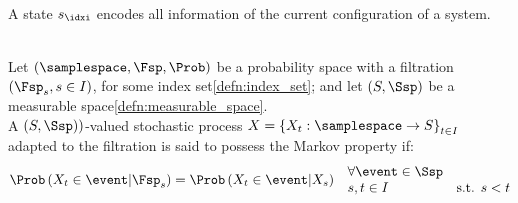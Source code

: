 \begin{defnbox}\nospacing
  \begin{defn}[States\hfill\tc{black}{$\Ssp=\left\{s_1,\ldots,s_{\idxn}\right\}$}]\label{defn:markov_states}\leavevmode\\
    A state $s_{\idxi}$ encodes all information of the current configuration of a system.
  \end{defn}
\end{defnbox}
\begin{defnbox}\nospacing
  \begin{defn}\label{defn:markovian_property}\leavevmode\\
    Let  $(\samplespace, \Fsp, \Prob)$ be a probability space with a filtration
    $\left(\Fsp_{s},s\in I\right)$, for some index set\cref{defn:index_set}; and let $\left(S,\Ssp\right)$ be a measurable space\cref{defn:measurable_space}.\\
    A $\left(S,\Ssp)\right)$-valued stochastic process $X=\left\{X_{t}:\samplespace\to S\right\}_{t\in I}$ adapted to the
    filtration is said to possess the Markov property if:
    \begin{align}
      \Prob \left(X_{t}\in\event|\Fsp_{s}\right)=\Prob\left(X_{t}\in\event|X_{s}\right)&&
                                                                                          \begin{aligned}
                                                                                            &\forall\event\in\Ssp \\[-1\jot]
                                                                                            & s,t\in I&\text{s.t. } s<t
                                                                                          \end{aligned}
    \end{align}
  \end{defn}
\end{defnbox}
